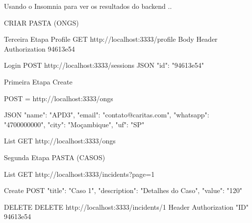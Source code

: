 Usando o Insomnia para ver os resultados do backend ..

CRIAR PASTA (ONGS)


Terceira Etapa
Profile
GET http://localhost:3333/profile
Body
Header Authorization  94613e54

Login
POST http://localhost:3333/sessions
JSON 
{
	"id": "94613e54"
}



Primeira Etapa
Create

POST = http://localhost:3333/ongs

JSON 
{
	"name": "APD3",
	"email": "contato@caritas.com",
	"whatsapp": "4700000000",
	"city": "Moçambique",
	"uf": "SP"
}

List
GET http://localhost:3333/ongs

Segunda Etapa
PASTA (CASOS)

List
GET http://localhost:3333/incidents?page=1

Create
POST 
{
	"title": "Caso 1",
	"description": "Detalhes do Caso",
	"value": "120"
}

DELETE
DELETE http://localhost:3333/incidents/1
Header Authorization "ID" 94613e54 

